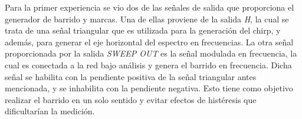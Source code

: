     Para la primer experiencia se vio dos de las señales de salida que proporciona el generador de barrido
    y marcas. Una de ellas proviene de la salida \textit{H}, la cual se trata de una señal triangular que es
    utilizada para la generación del chirp, y además, para generar el eje horizontal del espectro en frecuencias.
    La otra señal proporcionada por la salida  \textit{SWEEP OUT} es la señal modulada en frecuencia, la cual es conectada
    a la red bajo análisis y genera el barrido en frecuencia. Dicha señal se habilita con la pendiente positiva
    de la señal triangular antes mencionada, y se inhabilita con la pendiente negativa. Esto tiene como objetivo
    realizar el barrido en un solo sentido y evitar efectos de histéresis que dificultarían la medición.

